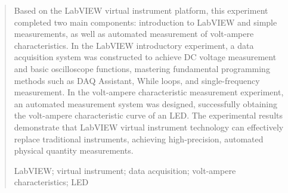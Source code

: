 \documentclass[12pt,a4paper]{article}
\begin{document}
\begin{quote}
    \fontsize{9}{10.8}\selectfont
    \setlength{\leftskip}{2em}
    \setlength{\rightskip}{2em}

    Based on the LabVIEW virtual instrument platform, this experiment completed two main components: introduction to LabVIEW and simple measurements, as well as automated measurement of volt-ampere characteristics. In the LabVIEW introductory experiment, a data acquisition system was constructed to achieve DC voltage measurement and basic oscilloscope functions, mastering fundamental programming methods such as DAQ Assistant, While loops, and single-frequency measurement. In the volt-ampere characteristic measurement experiment, an automated measurement system was designed, successfully obtaining the volt-ampere characteristic curve of an LED. The experimental results demonstrate that LabVIEW virtual instrument technology can effectively replace traditional instruments, achieving high-precision, automated physical quantity measurements.
    
    \vspace{0.5\baselineskip}
    LabVIEW; virtual instrument; data acquisition; volt-ampere characteristics; LED
\end{quote}

\vspace{1cm}
\end{document}
